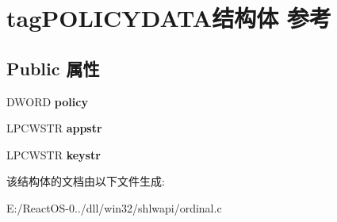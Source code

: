 \hypertarget{structtag_p_o_l_i_c_y_d_a_t_a}{}\section{tag\+P\+O\+L\+I\+C\+Y\+D\+A\+T\+A结构体 参考}
\label{structtag_p_o_l_i_c_y_d_a_t_a}
\subsection*{Public 属性}
\begin{DoxyCompactItemize}
\item 
\mbox{\label{structtag_p_o_l_i_c_y_d_a_t_a_a320496267a8556b8c4cfa8448babee9b}} 
D\+W\+O\+RD {\bfseries policy}
\item 
\mbox{\label{structtag_p_o_l_i_c_y_d_a_t_a_abc32c715a866d729ff2c267a58ae14e0}} 
L\+P\+C\+W\+S\+TR {\bfseries appstr}
\item 
\mbox{\label{structtag_p_o_l_i_c_y_d_a_t_a_a839395df61ef47c511d477fd7721f420}} 
L\+P\+C\+W\+S\+TR {\bfseries keystr}
\end{DoxyCompactItemize}


该结构体的文档由以下文件生成\+:\begin{DoxyCompactItemize}
\item 
E\+:/\+React\+O\+S-\/0../dll/win32/shlwapi/ordinal.\+c\end{DoxyCompactItemize}
